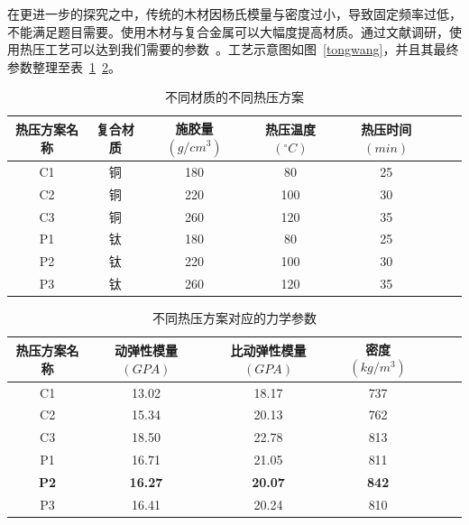 \documentclass[withoutpreface,bwprint]{cumcmthesis} %
\begin{document}
在更进一步的探究之中，传统的木材因杨氏模量与密度过小，导致固定频率过低，不能满足题目需要。使用木材与复合金属可以大幅度提高材质。通过文献调研，使用热压工艺可以达到我们需要的参数\cite{ref10}~\cite{ref11}。工艺示意图如图~\ref{tongwang}，并且其最终参数整理至表~\ref{reya}~\ref{reyalixue}。
\begin{table}[htb]
\centering
\caption{不同材质的不同热压方案}
\label{table1}
\begin{tabular}{@{}ccccccc@{}}
\toprule
\textbf{热压方案名称}&\textbf{复合材质}&\textbf{施胶量$(g/cm^3)$}&\textbf{热压温度$(^\circ C)$}&\textbf{热压时间$(min)$} \\
\midrule
C1&铜&180&80&25\\
C2&铜&220&100&30\\
C3&铜&260&120&35\\
P1&钛&180&80&25\\
P2&钛&220&100&30\\
P3&钛&260&120&35\\
\bottomrule
\end{tabular}\label{reya}
\end{table}

\begin{table}[htb]
\centering
\caption{不同热压方案对应的力学参数}
\label{table1}
\begin{tabular}{@{}ccccccc@{}}
\toprule
\textbf{热压方案名称}&\textbf{动弹性模量$(GPA)$}&\textbf{比动弹性模量$(GPA)$} & \textbf{密度$(kg/m^3)$}\\
\midrule
C1&13.02&18.17&737\\
C2&15.34&20.13&762\\
C3&18.50&22.78&813\\
P1&16.71&21.05&811\\
\textbf{P2}&\textbf{16.27}&\textbf{20.07}&\textbf{842}\\
P3&16.41&20.24&810\\
\bottomrule
\end{tabular}\label{reyalixue}
\end{table}
\end{document}
